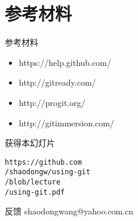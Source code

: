 \part{参考材料}

\begin{frame}[fragile]{参考材料}
    \begin{itemize}
        \item https://help.github.com/
        \item http://gitready.com/
        \item http://progit.org/
        \item http://gitimmersion.com/
    \end{itemize}
\end{frame}

\begin{frame}{获得本幻灯片}

{\Huge\tt https://github.com\\
/shaodongw/using-git\\
/blob/lecture\\
/using-git.pdf\\}
\end{frame}

\begin{frame}[<+->][fragile]{反馈}
shaodongwang@yahoo.com.cn
\end{frame}

